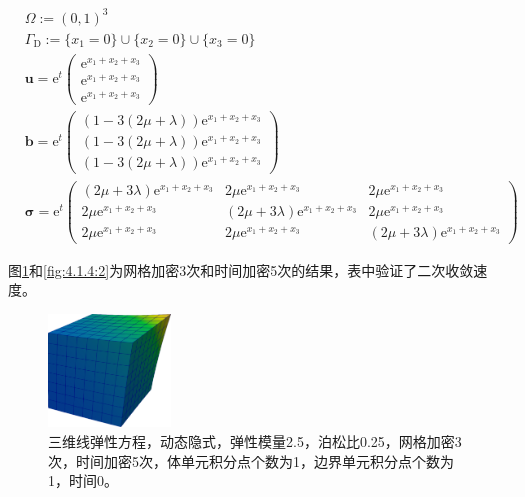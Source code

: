 \begin{equation}\label{eq:4.1.4:4}
  \begin{split}
    &\Omega:=(0,1)^3\\
    &\Gamma_{\mathrm D}:=\{x_1=0\}\cup\{x_2=0\}\cup\{x_3=0\} \\
    &\mathbf u = \mathrm e^t \left(\begin{array}{c} 
      \mathrm e^{x_1+x_2+x_3}\\
      \mathrm e^{x_1+x_2+x_3}\\
      \mathrm e^{x_1+x_2+x_3}
    \end{array}\right)\\
    &\mathbf b = \mathrm e^t\left(\begin{array}{c}
      (1-3  (2  \mu + \lambda))  \mathrm e^{x_1+x_2+x_3}\\
      (1-3  (2  \mu + \lambda))  \mathrm e^{x_1+x_2+x_3}\\
      (1-3  (2  \mu + \lambda))  \mathrm e^{x_1+x_2+x_3}
    \end{array}\right)\\
    &\mathbf \sigma 
    =\mathrm e^t\left(\begin{array}{ccc}
      (2\mu + 3\lambda)\mathrm e^{x_1+x_2+x_3} & 2\mu\mathrm e^{x_1+x_2+x_3} & 2\mu\mathrm e^{x_1+x_2+x_3}\\
      2\mu\mathrm e^{x_1+x_2+x_3} & (2\mu + 3\lambda)\mathrm e^{x_1+x_2+x_3} &  2\mu\mathrm e^{x_1+x_2+x_3}\\
      2\mu\mathrm e^{x_1+x_2+x_3} & 2\mu\mathrm e^{x_1+x_2+x_3} & (2\mu + 3\lambda)\mathrm e^{x_1+x_2+x_3}  
    \end{array}\right)
  \end{split}
\end{equation}


图\ref{fig:4.1.4:1}和\ref{fig:4.1.4:2}为网格加密3次和时间加密5次的结果，表中验证了二次收敛速度。

\begin{figure}[!htbp]
  \centering
  \includegraphics[height=3cm]{fig/4/4.1.4/1.png}
  \caption{三维线弹性方程，动态隐式，弹性模量2.5，泊松比0.25，网格加密3次，时间加密5次，体单元积分点个数为1，边界单元积分点个数为1，时间0。}
  \label{fig:4.1.4:1}
\end{figure}

